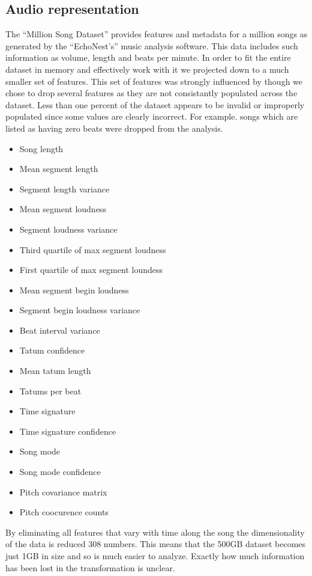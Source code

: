 \documentclass[a4paper,10pt]{article}
\begin{document}
\subsection{Audio representation}
The ``Million Song Dataset'' provides features and metadata for a million songs as generated by the ``EchoNest's'' music analysis software. This data includes such information as volume, length and beats per minute. In order to fit the entire dataset in memory and effectively work with it we projected down to a much smaller set of features. This set of features was strongly influenced by \cite{Slaney_learninga} though we chose to drop several features as they are not consistantly populated across the dataset. Less than one percent of the dataset appears to be invalid or improperly populated since some values are clearly incorrect. For example. songs which are listed as having zero beats were dropped from the analysis.

\begin{itemize}
 \item Song length
 \item Mean segment length
 \item Segment length variance
 \item Mean segment loudness
 \item Segment loudness variance
 \item Third quartile of max segment loudness 
 \item First quartile of max segment loundess
 \item Mean segment begin loudness
 \item Segment begin loudness variance
 \item Beat interval variance
 \item Tatum confidence
 \item Mean tatum length
 \item Tatums per beat
 \item Time signature
 \item Time signature confidence
 \item Song mode
 \item Song mode confidence
 \item Pitch covariance matrix
 \item Pitch coocurence counts
\end{itemize}

By eliminating all features that vary with time along the song the dimensionality of the data is reduced 308 numbers. This means that the 500GB dataset becomes just 1GB in size and so is much easier to analyze. Exactly how much information has been lost in the transformation is unclear. 
\end{document}
